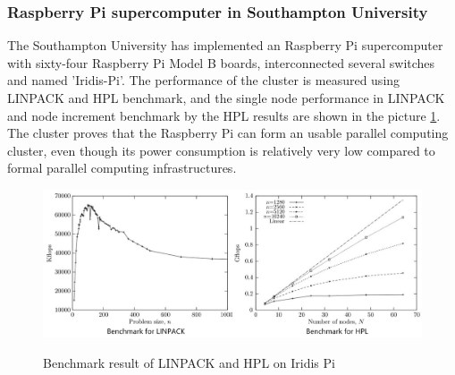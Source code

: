 \documentclass[11pt,openright,a4paper]{report}
\begin{document}
\subsubsection{Raspberry Pi supercomputer in Southampton University}
The Southampton University has implemented an Raspberry Pi supercomputer with sixty-four Raspberry Pi Model B boards, interconnected several switches and named 'Iridis-Pi'\cite{cox2014iridis}. The performance of the cluster is measured using LINPACK and HPL benchmark, and the single node performance in LINPACK and node increment benchmark by the HPL results are shown in the picture \ref{fig:iridisBenchmark}. The cluster proves that the Raspberry Pi can form an usable parallel computing cluster, even though its power consumption is relatively very low compared to formal parallel computing infrastructures.\\
\begin{figure}[H]
\centering
\includegraphics[width=0.7\linewidth]{picture/iridisBenchmark}
\caption{Benchmark result of LINPACK and HPL on Iridis Pi}\cite{cox2014iridis} 
\label{fig:iridisBenchmark}
\end{figure}
\end{document}
